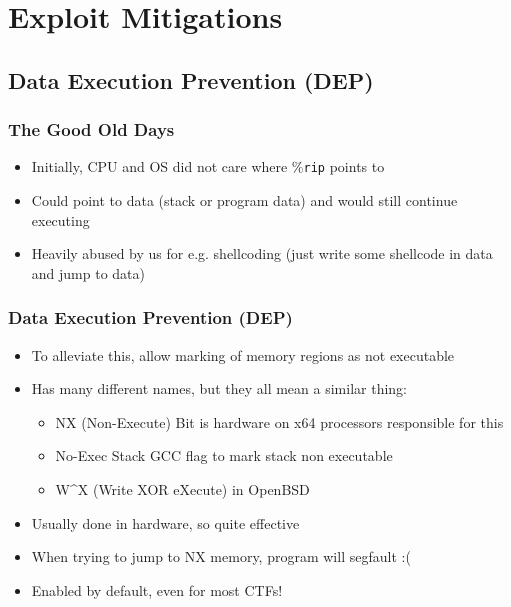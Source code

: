 \documentclass[aspectratio=169]{beamer}
\newcommand{\reg}[1]{\%\texttt{#1}}
\begin{document}
{
\hidesectionframe
\showsubsectionframe
\section{Exploit Mitigations}

\subsection{Data Execution Prevention (DEP)}

\begin{frame}[fragile]
    \frametitle{The Good Old Days}
    \begin{itemize}
        \item Initially, CPU and OS did not care where \reg{rip} points to
        \item Could point to data (stack or program data) and would still continue executing
        \item Heavily abused by us for e.g. shellcoding (just write some shellcode in data and jump to data)
    \end{itemize}
\end{frame}

\begin{frame}
    \frametitle{Data Execution Prevention (DEP)}
    \begin{itemize}
        \item To alleviate this, allow marking of memory regions as not executable
        \item Has many different names, but they all mean a similar thing:
        \begin{itemize}
            \item NX (Non-Execute) Bit is hardware on x64 processors responsible for this
            \item No-Exec Stack GCC flag to mark stack non executable
            \item W\^{}X (Write XOR eXecute) in OpenBSD
        \end{itemize}
        \item Usually done in hardware, so quite effective
        \item When trying to jump to NX memory, program will segfault :(
        \item Enabled by default, even for most CTFs!
    \end{itemize}
\end{frame}

}
\end{document}
